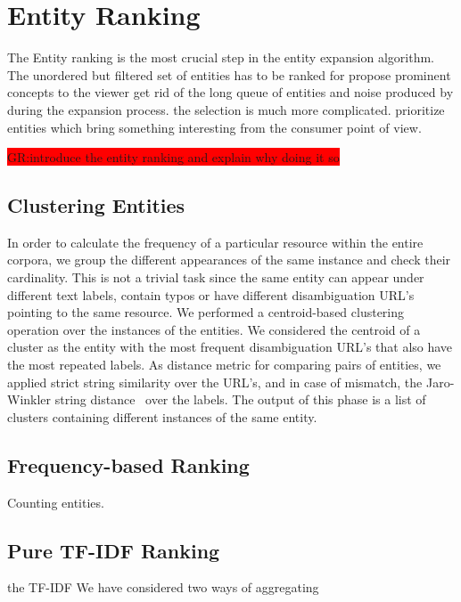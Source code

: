 \documentclass{llncs}
\newcommand{\todo}[1]{\colorbox{red}{#1}}
\begin{document}
\section{Entity Ranking}
\label{sec:Ranking}

The Entity ranking is the most crucial step in the entity expansion algorithm. The unordered but filtered set of entities has to be ranked for propose prominent concepts to the viewer get rid of the long queue of entities and noise produced by during the expansion process. the selection is much more complicated. 
prioritize entities which bring something interesting from the consumer point of view. 

\todo{GR:introduce the entity ranking and explain why doing it so}

\subsection{Clustering Entities}
In order to calculate the frequency of a particular resource within the entire corpora, we group the different appearances of the same instance and check their cardinality. This is not a trivial task since the same entity can appear under different text labels, contain typos or have different disambiguation URL's pointing to the same resource. We performed a centroid-based clustering operation over the instances of the entities. We considered the centroid of a cluster as the entity with the most frequent disambiguation URL's that also have the most repeated labels. As distance metric for comparing pairs of entities, we applied strict string similarity over the URL's, and in case of mismatch, the Jaro-Winkler string distance~\cite{winkler2006overview} over the labels. The output of this phase is a list of clusters containing different instances of the same entity.

\subsection{Frequency-based Ranking}

Counting entities.


\subsection{Pure TF-IDF Ranking}

the TF-IDF
We have considered two ways of aggregating
\end{document}
